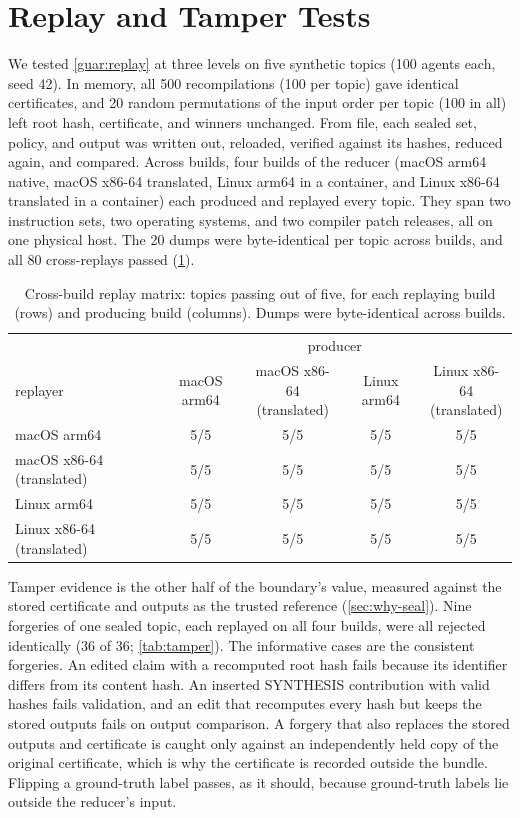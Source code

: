 \section{Replay and Tamper Tests}
\label{sec:replay-details}

We tested \cref{guar:replay} at three levels on five synthetic topics (100 agents each, seed 42). In memory, all 500 recompilations (100 per topic) gave identical certificates, and 20 random permutations of the input order per topic (100 in all) left root hash, certificate, and winners unchanged. From file, each sealed set, policy, and output was written out, reloaded, verified against its hashes, reduced again, and compared. Across builds, four builds of the reducer (macOS arm64 native, macOS x86-64 translated, Linux arm64 in a container, and Linux x86-64 translated in a container) each produced and replayed every topic. They span two instruction sets, two operating systems, and two compiler patch releases, all on one physical host. The 20 dumps were byte-identical per topic across builds, and all 80 cross-replays passed (\cref{tab:crossbuild}).

\begin{table}[t]
  \centering
  \caption{Cross-build replay matrix: topics passing out of five, for each replaying build (rows) and producing build (columns). Dumps were byte-identical across builds.}
  \label{tab:crossbuild}
  \small
  \begin{tabular}{@{}lcccc@{}}
    \toprule
    & \multicolumn{4}{c}{producer} \\
    \cmidrule(l){2-5}
    replayer & macOS arm64 & \makecell{macOS x86-64\\(translated)} & Linux arm64 & \makecell{Linux x86-64\\(translated)} \\
    \midrule
    macOS arm64 & 5/5 & 5/5 & 5/5 & 5/5 \\
    macOS x86-64 (translated) & 5/5 & 5/5 & 5/5 & 5/5 \\
    Linux arm64 & 5/5 & 5/5 & 5/5 & 5/5 \\
    Linux x86-64 (translated) & 5/5 & 5/5 & 5/5 & 5/5 \\
    \bottomrule
  \end{tabular}
\end{table}

Tamper evidence is the other half of the boundary's value, measured against the stored certificate and outputs as the trusted reference (\cref{sec:why-seal}). Nine forgeries of one sealed topic, each replayed on all four builds, were all rejected identically (36 of 36; \cref{tab:tamper}). The informative cases are the consistent forgeries. An edited claim with a recomputed root hash fails because its identifier differs from its content hash. An inserted SYNTHESIS contribution with valid hashes fails validation, and an edit that recomputes every hash but keeps the stored outputs fails on output comparison. A forgery that also replaces the stored outputs and certificate is caught only against an independently held copy of the original certificate, which is why the certificate is recorded outside the bundle. Flipping a ground-truth label passes, as it should, because ground-truth labels lie outside the reducer's input.

